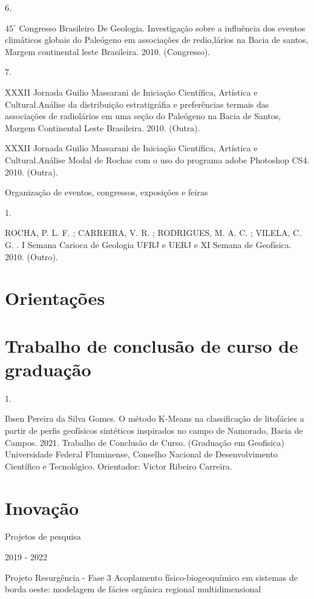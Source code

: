 \documentclass[10pt]{article}
\begin{document}
6.

$45^{\circ}$ Congresso Brasileiro De Geologia. Investigação sobre a influência dos eventos climáticos globais do Paleógeno em associações de redio,lários na Bacia de santos, Margem continental leste Brasileira. 2010. (Congresso).

7.

XXXII Jornada Guilio Massarani de Iniciação Científica, Artística e Cultural.Análise da distribuição estratigráfia e preferências termais das associações de radiolários em uma seção do Paleógeno na Bacia de Santos, Margem Continental Leste Brasileira. 2010. (Outra).

XXXII Jornada Guilio Massarani de Iniciação Científica, Artística e Cultural.Análise Modal de Rochas com o uso do programa adobe Photoshop CS4. 2010. (Outra).

Organização de eventos, congressos, exposições e feiras

1.

ROCHA, P. L. F. ; CARREIRA, V. R. ; RODRIGUES, M. A. C. ; VILELA, C. G. . I Semana Carioca de Geologia UFRJ e UERJ e XI Semana de Geofísica. 2010. (Outro).

\section*{Orientações}
\section*{Trabalho de conclusão de curso de graduação}
1.

Ibsen Pereira da Silva Gomes. O método K-Means na classificação de litofácies a partir de perfis geofísicos sintéticos inspirados no campo de Namorado, Bacia de Campos. 2021. Trabalho de Conclusão de Curso. (Graduação em Geofisica) Universidade Federal Fluminense, Conselho Nacional de Desenvolvimento Científico e Tecnológico. Orientador: Victor Ribeiro Carreira.

\section*{Inovação}
Projetos de pesquisa

2019 - 2022

Projeto Resurgência - Fase 3 Acoplamento físico-biogeoquímico em sistemas de borda oeste: modelagem de fácies orgânica regional multidimensional
\end{document}
